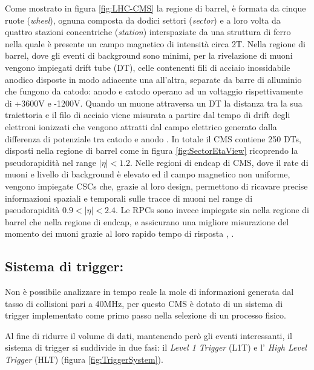 

Come mostrato in figura \ref{fig:LHC-CMS} la regione di barrel, è formata da cinque ruote (\textit{wheel}), ognuna composta da dodici settori (\textit{sector}) e a loro volta da quattro stazioni concentriche (\textit{station}) interspaziate da una struttura di ferro nella quale è presente un campo magnetico di intensità circa 2T. Nella regione di barrel, dove gli eventi di background sono minimi, per la rivelazione di muoni vengono impiegati drift tube (DT), celle contenenti fili di acciaio inossidabile anodico disposte in modo adiacente una all'altra, separate da barre di alluminio che fungono da catodo: anodo e catodo operano ad un voltaggio rispettivamente di +3600V e -1200V. Quando un muone attraversa un DT la distanza tra la sua traiettoria e il filo di acciaio viene misurata a partire dal tempo di drift degli elettroni ionizzati che vengono attratti dal campo elettrico generato dalla differenza di potenziale tra catodo e anodo \cite{MasterThesisNicLai}. \newline
In totale il CMS contiene 250 DTs, disposti nella regione di barrel come in figura \ref{fig:SectorEtaView} ricoprendo la pseudorapidità nel range $|\eta| < 1.2$. \newline
Nelle regioni di endcap di CMS, dove il rate di muoni e livello di background è elevato ed il campo magnetico non uniforme, vengono impiegate CSCs che, grazie al loro design, permettono di ricavare precise informazioni spaziali e temporali sulle tracce di muoni nel range di pseudorapidità $0.9 < |\eta| < 2.4$. Le RPCs sono invece impiegate sia nella regione di barrel che nella regione di endcap, e assicurano una migliore misurazione del momento dei muoni grazie al loro rapido tempo di risposta \cite{MasterThesisNicLai}, \cite{cms2008cms}.


\subsection{Sistema di trigger:}
\label{sec:SistemaDiTrigger}

Non è possibile analizzare in tempo reale la mole di informazioni generata dal tasso di collisioni pari a 40MHz, per questo CMS è dotato di un sistema di trigger implementato come primo passo nella selezione di un processo fisico. 

Al fine di ridurre il volume di dati, mantenendo però gli eventi interessanti, il sistema di trigger si suddivide in due fasi: il \textit{Level 1 Trigger} (L1T) e l' \textit{High Level Trigger} (HLT) (figura \ref{fig:TriggerSystem}). 

